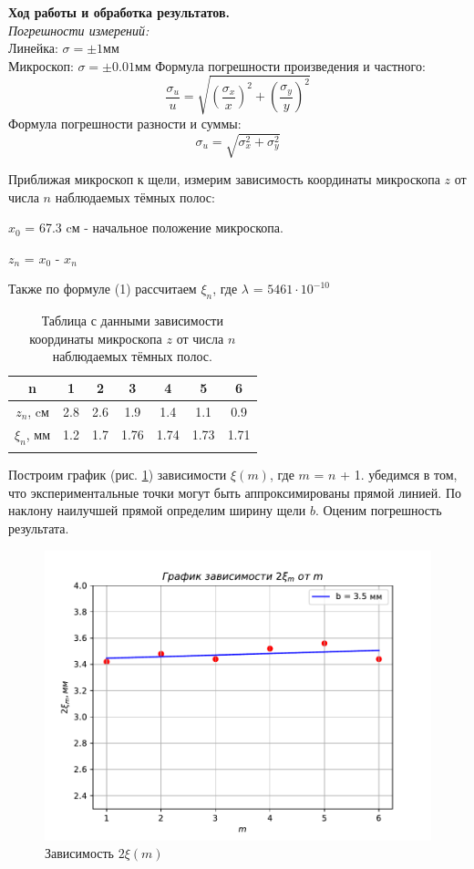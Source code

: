 \documentclass[a4paper, 12pt]{article}%
\begin{document}
	
		
	\textbf{Ход работы и обработка результатов.}\\
	
	\textit{Погрешности измерений:}\\
	Линейка: $\sigma = \pm 1$мм\\
	Микроскоп: $\sigma = \pm 0.01$мм
	Формула погрешности произведения и частного:\\
	\begin{equation}
		\frac{\sigma_u}{u}=\sqrt{\left(\frac{\sigma_x}{x}\right)^2+\left(\frac{\sigma_y}{y}\right)^2}
	\end{equation}
	Формула погрешности разности и суммы:
	\begin{equation}
		\sigma_u=\sqrt{\sigma_x^2+\sigma_y^2}
	\end{equation}
	
	Приближая микроскоп к щели, измерим зависимость координаты микроскопа $z$ от числа $n$ наблюдаемых тёмных полос:
	
	$x_0$ = 67.3 cм - начальное положение микроскопа.
	
	$z_n$ = $x_0$ - $x_n$
	
	
	Также по формуле (1) рассчитаем $\xi_n$, где $\lambda$ = $5461 \cdot 10^{-10}$
	
	
	\begin{longtable}{|c|c|c|c|c|c|c|}
		\hline
		n& 1&  2 & 3& 4 & 5& 6\\ \hline
		$z_n$, cм& 2.8& 2.6 & 1.9& 1.4 & 1.1& 0.9\\ \hline
		$\xi_n$, мм& 1.2& 1.7 & 1.76& 1.74 & 1.73& 1.71\\ \hline
		\caption{Таблица с данными зависимости координаты микроскопа $z$ от числа $n$ наблюдаемых тёмных полос.}
	\end{longtable}

Построим график (рис. \ref{1}) зависимости $\xi(m)$, где $m$ = $n$ + 1. убедимся в том, что
экспериментальные точки могут быть аппроксимированы прямой линией. По наклону наилучшей прямой определим ширину щели $b$. Оценим погрешность результата.

\begin{figure}[H]
	\begin{center}
		\includegraphics[width=0.8\linewidth]{1.pdf}
		\caption{Зависимость $2\xi(m)$}
		\label{1}
	\end{center}
\end{figure}
\end{document}
